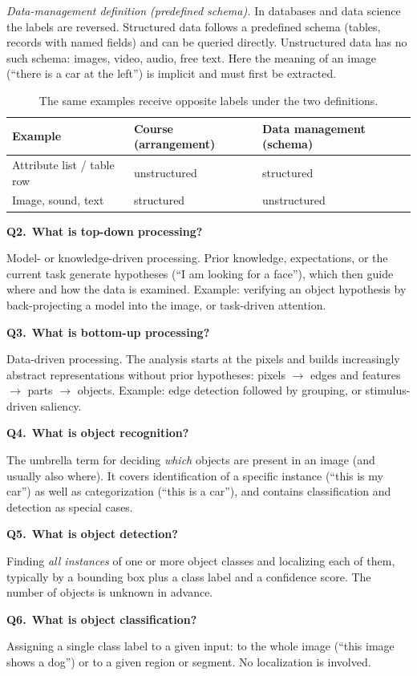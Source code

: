 \documentclass[11pt,a4paper]{article}
\newcommand{\keep}[1]{\par
  \ifdim\dimexpr\pagegoal-\pagetotal\relax<#1\relax\newpage\fi}
\newcommand{\q}[2]{\keep{2.5cm}\medskip
  {\sffamily\bfseries\color{questc}Q#1.}\ {\sffamily\bfseries #2}\par}
\begin{document}
\emph{Data-management definition (predefined schema).} In databases and data
science the labels are reversed. Structured data follows a predefined schema
(tables, records with named fields) and can be queried directly. Unstructured
data has no such schema: images, video, audio, free text. Here the meaning of
an image (``there is a car at the left'') is implicit and must first be
extracted.

\begin{table}[ht]
  \centering\small
  \begin{tabular}{@{}lll@{}}
    \toprule
    Example & Course (arrangement) & Data management (schema) \\
    \midrule
    Attribute list / table row & unstructured & structured \\
    Image, sound, text & structured & unstructured \\
    \bottomrule
  \end{tabular}
  \caption{The same examples receive opposite labels under the two
  definitions.}
\end{table}

\q{2}{What is top-down processing?}
Model- or knowledge-driven processing. Prior knowledge, expectations, or the
current task generate hypotheses (``I am looking for a face''), which then guide
where and how the data is examined. Example: verifying an object hypothesis by
back-projecting a model into the image, or task-driven attention.

\q{3}{What is bottom-up processing?}
Data-driven processing. The analysis starts at the pixels and builds
increasingly abstract representations without prior hypotheses:
pixels $\rightarrow$ edges and features $\rightarrow$ parts
$\rightarrow$ objects. Example: edge detection followed by grouping, or
stimulus-driven saliency.

\q{4}{What is object recognition?}
The umbrella term for deciding \emph{which} objects are present in an image
(and usually also where). It covers identification of a specific instance
(``this is my car'') as well as categorization (``this is a car''), and contains
classification and detection as special cases.

\q{5}{What is object detection?}
Finding \emph{all instances} of one or more object classes and localizing each
of them, typically by a bounding box plus a class label and a confidence score.
The number of objects is unknown in advance.

\q{6}{What is object classification?}
Assigning a single class label to a given input: to the whole image
(``this image shows a dog'') or to a given region or segment. No localization is
involved.
\end{document}
